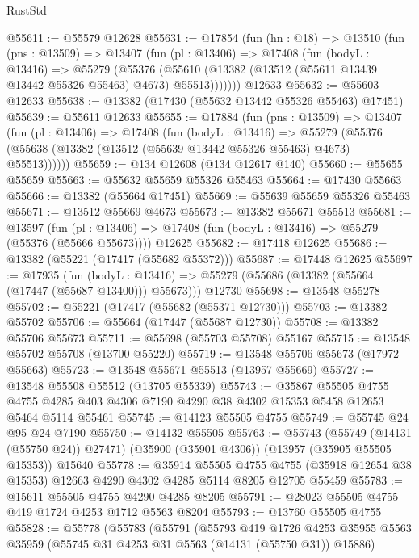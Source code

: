 \begin{lexlean}{RustStd}
\begin{coremodule}
@55611 := @55579 @12628
@55631 := @17854
    (fun (hn : @18) =>
    @13510
      (fun (pns : @13509) =>
      @13407
        (fun (pl : @13406) =>
        @17408
          (fun (bodyL : @13416) =>
          @55279
            (@55376
              (@55610 (@13382 (@13512 (@55611 @13439 @13442 @55326 @55463) @4673) @55513)))))))
    @12633
@55632 := @55603 @12633
@55638 := @13382 (@17430 (@55632 @13442 @55326 @55463) @17451)
@55639 := @55611 @12633
@55655 := @17884
    (fun (pns : @13509) =>
    @13407
      (fun (pl : @13406) =>
      @17408
        (fun (bodyL : @13416) =>
        @55279 (@55376 (@55638 (@13382 (@13512 (@55639 @13442 @55326 @55463) @4673) @55513))))))
@55659 := @134 @12608 (@134 @12617 @140)
@55660 := @55655 @55659
@55663 := @55632 @55659 @55326 @55463
@55664 := @17430 @55663
@55666 := @13382 (@55664 @17451)
@55669 := @55639 @55659 @55326 @55463
@55671 := @13512 @55669 @4673
@55673 := @13382 @55671 @55513
@55681 := @13597
    (fun (pl : @13406) => @17408 (fun (bodyL : @13416) => @55279 (@55376 (@55666 @55673))))
    @12625
@55682 := @17418 @12625
@55686 := @13382 (@55221 (@17417 (@55682 @55372)))
@55687 := @17448 @12625
@55697 := @17935
    (fun (bodyL : @13416) => @55279 (@55686 (@13382 (@55664 (@17447 (@55687 @13400))) @55673)))
    @12730
@55698 := @13548 @55278
@55702 := @55221 (@17417 (@55682 (@55371 @12730)))
@55703 := @13382 @55702
@55706 := @55664 (@17447 (@55687 @12730))
@55708 := @13382 @55706 @55673
@55711 := @55698 (@55703 @55708) @55167
@55715 := @13548 @55702 @55708 (@13700 @55220)
@55719 := @13548 @55706 @55673 (@17972 @55663)
@55723 := @13548 @55671 @55513 (@13957 @55669)
@55727 := @13548 @55508 @55512 (@13705 @55339)
@55743 := @35867
    @55505
    @4755
    @4755
    @4285
    @403
    @4306
    @7190
    @4290
    @38
    @4302
    @15353
    @5458
    @12653
    @5464
    @5114
    @55461
@55745 := @14123 @55505 @4755
@55749 := @55745 @24 @95 @24 @7190
@55750 := @14132 @55505
@55763 := @55743
    (@55749 (@14131 (@55750 @24)) @27471)
    (@35900 (@35901 @4306))
    (@13957 (@35905 @55505 @15353))
    @15640
@55778 := @35914
    @55505
    @4755
    @4755
    (@35918 @12654 @38 @15353)
    @12663
    @4290
    @4302
    @4285
    @5114
    @8205
    @12705
    @55459
@55783 := @15611 @55505 @4755 @4290 @4285 @8205
@55791 := @28023 @55505 @4755 @419 @1724 @4253 @1712 @5563 @8204
@55793 := @13760 @55505 @4755
@55828 := @55778
    (@55783
      (@55791
        (@55793
          @419
          @1726
          @4253
          @35955
          @5563
          @35959
          (@55745 @31 @4253 @31 @5563 (@14131 (@55750 @31)) @15886)

\end{coremodule}
\end{lexlean}
